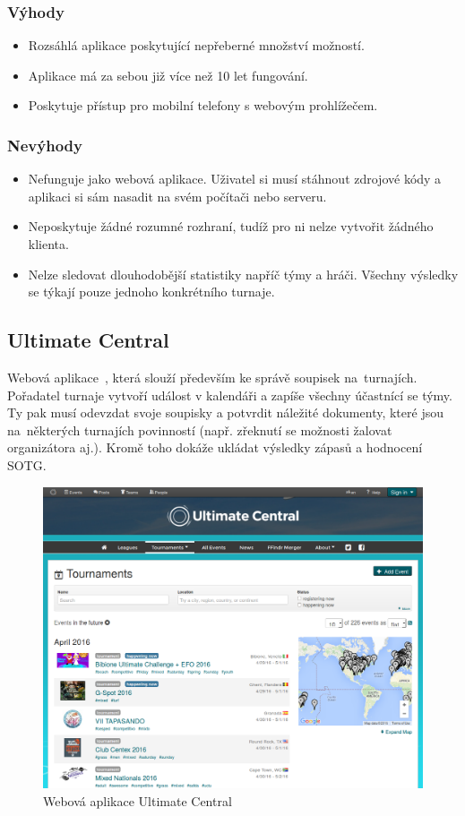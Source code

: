\subsubsection*{Výhody}
\begin{itemize}
  \item Rozsáhlá aplikace poskytující nepřeberné množství možností.
  \item Aplikace má za sebou již více než 10 let fungování.
  \item Poskytuje přístup pro mobilní telefony s webovým prohlížečem.
\end{itemize}

\subsubsection*{Nevýhody}
\begin{itemize}
  \item Nefunguje jako webová aplikace. Uživatel si musí stáhnout zdrojové kódy a aplikaci si sám nasadit na svém počítači nebo serveru.
  \item Neposkytuje žádné rozumné rozhraní, tudíž pro ni nelze vytvořit žádného klienta.
  \item Nelze sledovat dlouhodobější statistiky napříč týmy a hráči. Všechny výsledky se týkají pouze jednoho konkrétního turnaje.
\end{itemize}

\subsection*{Ultimate Central}

Webová aplikace~\cite{ultimate_central}, která slouží především ke správě soupisek na~turnajích. Pořadatel turnaje vytvoří událost
v kalendáři a zapíše všechny účastnící se týmy. Ty pak musí odevzdat svoje soupisky a potvrdit náležité dokumenty,
které jsou na~některých turnajích povinností (např. zřeknutí se možnosti žalovat organizátora aj.).
Kromě toho dokáže ukládat výsledky zápasů a hodnocení SOTG. 

\begin{figure}[ht!]
\centering
\includegraphics[width=130mm]{./images/ultimate-central.png}
\caption{Webová aplikace Ultimate Central\label{overflow}}
\end{figure}

